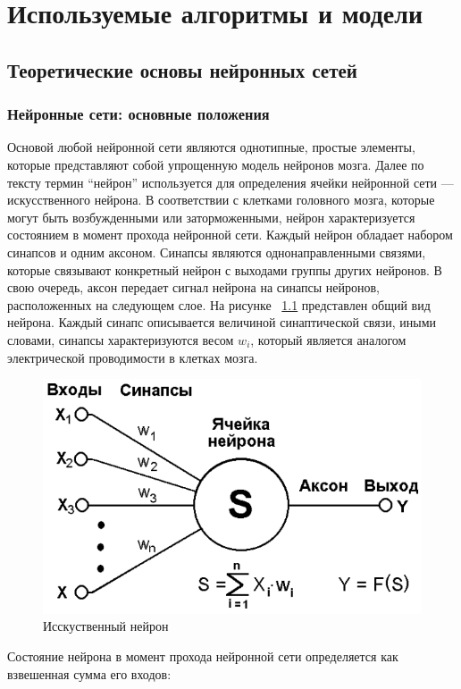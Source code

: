 \documentclass[a4paper,english,russian]{G2-105}
\begin{document}
\chapter{Используемые алгоритмы и модели}
\section{Теоретические основы нейронных сетей}
\subsection{Нейронные сети: основные положения}
\par Основой любой нейронной сети являются однотипные, простые элементы, которые представляют собой упрощенную модель нейронов мозга. Далее по тексту термин “нейрон” используется для определения ячейки нейронной сети --- искусственного нейрона. В соответствии с клетками головного мозга, которые могут быть возбужденными или заторможенными, нейрон характеризуется состоянием в момент прохода нейронной сети. Каждый нейрон обладает набором синапсов и одним аксоном. Синапсы являются однонаправленными связями, которые связывают конкретный нейрон с выходами группы других нейронов. В свою очередь, аксон передает сигнал нейрона на синапсы нейронов, расположенных на следующем слое. На рисунке ~\ref{neuron} представлен общий вид нейрона. Каждый синапс описывается величиной синаптической связи, иными словами, синапсы характеризуются весом $w_i$, который является аналогом электрической проводимости в клетках мозга.
\begin{figure}
    \includegraphics[width=0.6\linewidth]{neuron.png}
    \caption{Исскуственный нейрон}
	\label{neuron}
\end{figure}
\par Состояние нейрона в момент прохода нейронной сети определяется как взвешенная сумма его входов:
\end{document}
